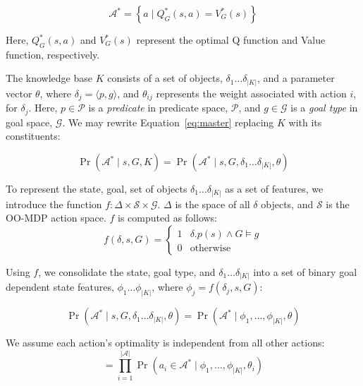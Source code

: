 \documentclass[conference]{IEEEtran}
\begin{document}
\begin{equation}
\mathcal{A}^* = \left\{ a \mid Q^*_G(s,a) = V^*_G(s) \right\}
\label{eq:opt_act_set}
\end{equation}

Here, $Q^*_G(s,a)$ and $V^*_G(s)$ represent the optimal Q function and 
Value function, respectively.

The knowledge base $K$ consists of a set of objects, $\delta_1 \ldots \delta_{|K|}$, and a 
parameter vector $\theta$, where $\delta_j = \langle p, g \rangle$, and $\theta_{ij}$
represents the weight associated with action $i$, for $\delta_j$. Here, $p \in \mathcal{P}$
is a {\it predicate} in predicate space, $\mathcal{P}$, and $g \in \mathcal{G}$ is a {\it goal type}
in goal space, $\mathcal{G}$. We may rewrite Equation~\ref{eq:master} replacing $K$ with
its constituents:

\begin{equation}
\Pr(\mathcal{A}^* \mid s, G, K) = \Pr(\mathcal{A}^* \mid s, G, \delta_1 \ldots \delta_{|K|}, \theta)
\end{equation}

To represent the state, goal, set of objects $\delta_1 \ldots \delta_{|K|}$ as a set of features,
we introduce the function $f : \Delta \times \mathcal{S} \times \mathcal{G}$.
$\Delta$ is the space of all $\delta$ objects, and $\mathcal{S}$
is the OO-MDP action space. $f$ is computed as follows:
\begin{equation}
f(\delta, s, G) = 
\begin{cases}
1& \delta.p(s) \wedge G \models g \\
0& \text{otherwise}
\end{cases}
\label{eq:f_func_def}
\end{equation}

Using $f$, we consolidate the state, goal type, and $\delta_1 \ldots \delta_{|K|}$ into a set of binary goal dependent
state features, $\phi_1 \ldots \phi_{|K|}$, where $\phi_j = f(\delta_j, s, G)$:

\begin{equation}
\Pr(\mathcal{A}^* \mid s, G, \delta_1 \ldots \delta_{|K|}, \theta) = \Pr(\mathcal{A}^* \mid \phi_1, \ldots, \phi_{|K|}, \theta)
\label{eq:feature_rep}
\end{equation}

We assume each action's optimality is independent from all other actions:
\begin{equation}
= \prod_{i=1}^{|\mathcal{A}|} \Pr(a_i \in \mathcal{A}^* \mid \phi_1, \ldots, \phi_{|K|}, \theta_i)
\label{eq:action_independ}
\end{equation}
\end{document}

